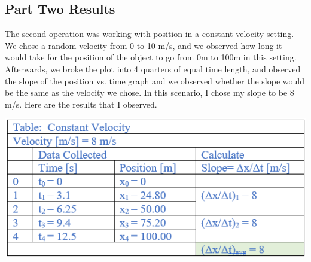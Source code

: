 \documentclass{article}
\begin{document}
\subsection {Part Two Results}
The second operation was working with position in a constant velocity setting. We chose a random velocity from 0 to 10 m/s, and we observed how long it would take for the position of the object to go from 0m to 100m in this setting. Afterwards, we broke the plot into 4 quarters of equal time length, and observed the slope of the position vs. time graph and we observed whether the slope would be the same as the velocity we chose. In this scenario, I chose my slope to be 8 m/s. Here are the results that I observed. 
\begin{center}
\includegraphics[scale=0.65]{data2.png}
\end{center}
\end{document}
